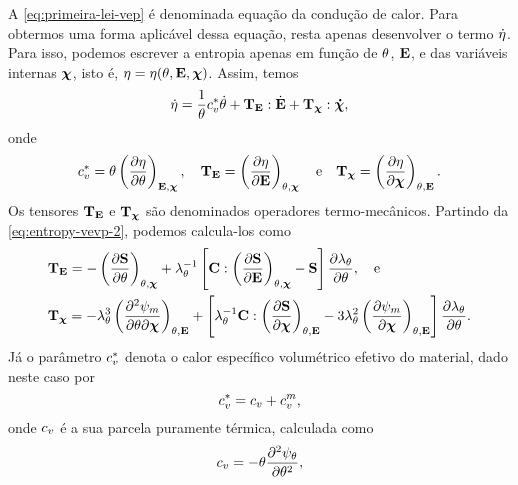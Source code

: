 \documentclass[Tese.tex]{subfiles}
\begin{document}
A \cref{eq:primeira-lei-vep} é denominada equação da condução de calor. Para obtermos uma forma aplicável dessa equação, resta apenas desenvolver o termo $\dot{\eta}$. Para isso, podemos escrever a entropia apenas em função de $\theta$, $\mathbf{E}$, e das variáveis internas $\boldsymbol{\chi}$, isto é, $\eta = \eta(\theta,\mathbf{E},\boldsymbol{\chi})$. Assim, temos
\begin{equation}
\dot{\eta} = \dfrac{1}{\theta}c_v^{*}\dot{\theta} + \mathbf{T}_{\mathbf{E}}:\dot{\mathbf{E}} + \mathbf{T}_{\boldsymbol{\chi}}:\boldsymbol{\dot{\chi}}, \label{eq:dotentropy-tvep}
\end{equation}
onde 
\begin{equation}
c_v^{*} = \theta\left(\dfrac{\partial\eta}{\partial\theta}\right)_{\mathbf{E},\boldsymbol{\chi}},\quad
\mathbf{T}_{\mathbf{E}} = \left(\dfrac{\partial\eta}{\partial\mathbf{E}}\right)_{\theta,\boldsymbol{\chi}} \text{\quad e\quad}
\mathbf{T}_{\boldsymbol{\chi}} = \left(\dfrac{\partial\eta}{\partial\boldsymbol{\chi}}\right)_{\theta,\mathbf{E}}.
\end{equation}
Os tensores $\mathbf{T}_{\mathbf{E}}$ e $\mathbf{T}_{\boldsymbol{\chi}}$ são denominados operadores termo-mecânicos. Partindo da \cref{eq:entropy-vevp-2}, podemos calcula-los como
\begin{align}
&\mathbf{T}_{\mathbf{E}} = -\left(\dfrac{\partial\mathbf{S}}{\partial\theta}\right)_{\theta,\boldsymbol{\chi}} + \lambda_{\theta}^{-1}\left[\mathbf{C}:\left(\dfrac{\partial\mathbf{S}}{\partial\mathbf{E}}\right)_{\theta,\boldsymbol{\chi}} - \mathbf{S}\right]\dfrac{\partial\lambda_{\theta}}{\partial\theta}, \text{\quad e}\\
&\mathbf{T}_{\boldsymbol{\chi}} = -\lambda_{\theta}^3\left(\dfrac{\partial^2\psi_m}{\partial\theta\partial\boldsymbol{\chi}}\right)_{\theta,\mathbf{E}} + \left[\lambda_{\theta}^{-1}\mathbf{C}:\left(\dfrac{\partial\mathbf{S}}{\partial\boldsymbol{\chi}}\right)_{\theta,\mathbf{E}} - 3\lambda_{\theta}^2\left(\dfrac{\partial\psi_m}{\partial\boldsymbol{\chi}}\right)_{\theta,\mathbf{E}}\right]\dfrac{\partial\lambda_{\theta}}{\partial\theta}.
\end{align}
Já o parâmetro $c_v^{*}$ denota o calor específico volumétrico efetivo do material, dado neste caso por
\begin{equation}
c_v^{*} = c_v + c_v^m,
\end{equation}
onde $c_v$ é a sua parcela puramente térmica, calculada como
\begin{equation}
c_v = -\theta\dfrac{\partial^2\psi_{\theta}}{\partial\theta^2},
\end{equation}
\end{document}
